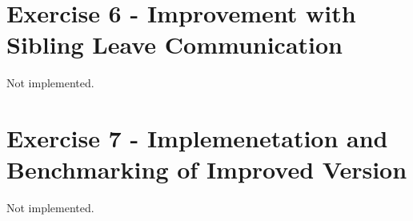 \section{Exercise 6 - Improvement with Sibling Leave Communication}
Not implemented.

\section{Exercise 7 - Implemenetation and Benchmarking of Improved Version}
Not implemented.